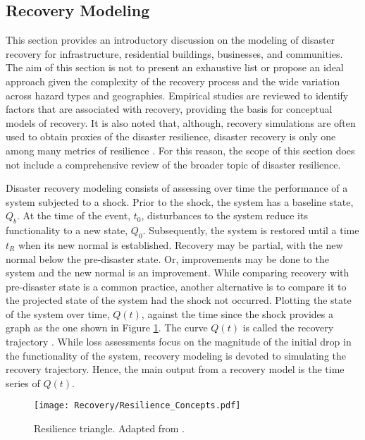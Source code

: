 
\begin{partbacktext}
\part{Recovery Modeling}

This section provides an introductory discussion on the modeling of disaster recovery for infrastructure, residential buildings, businesses, and communities. The aim of this section is not to present an exhaustive list or propose an ideal approach given the complexity of the recovery process and the wide variation across hazard types and geographies. Empirical studies are reviewed to identify factors that are associated with recovery, providing the basis for conceptual models of recovery. It is also noted that, although, recovery simulations are often used to obtain proxies of the disaster resilience, disaster recovery is only one among many metrics of resilience \citep{national2019building,kwasinski2016conceptual}. For this reason, the scope of this section does not include a comprehensive review of the broader topic of disaster resilience.\

Disaster recovery modeling consists of assessing over time the performance of a system subjected to a shock. Prior to the shock, the system has a baseline state, $Q_b$. At the time of the event, $t_0$, disturbances to the system reduce its functionality to a new state, $Q_0$. Subsequently, the system is restored until a time $t_R$ when its new normal is established. Recovery may be partial, with the new normal below the pre-disaster state. Or, improvements may be done to the system and the new normal is an improvement. While comparing recovery with pre-disaster state is a common practice, another alternative is to compare it to the projected state of the system had the shock not occurred. Plotting the state of the system over time, $Q(t)$, against the time since the shock provides a graph as the one shown in Figure \ref{fig:ResilienceTriangle}. The curve $Q(t)$ is called the recovery trajectory \citep{Bruneau2003}. While loss assessments focus on the magnitude of the initial drop in the functionality of the system, recovery modeling is devoted to simulating the recovery trajectory. Hence, the main output from a recovery model is the time series of $Q(t)$.\

\begin{figure}[htb]
    \centering
    \texttt{[image: Recovery/Resilience\_Concepts.pdf]}
    \caption{Resilience triangle. Adapted from \cite{Bruneau2003}.}
    \label{fig:ResilienceTriangle}
\end{figure}


\end{partbacktext}

